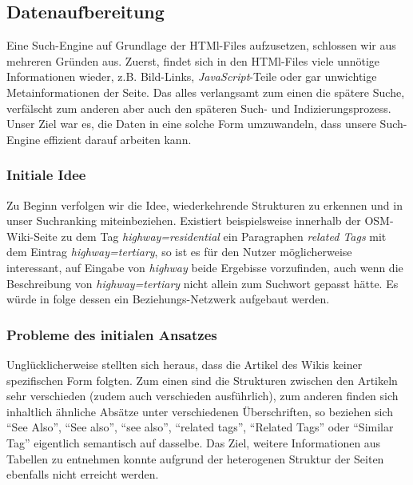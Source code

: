 \documentclass[12pt,pdftex,a4paper]{article}
\begin{document}
\subsection{Datenaufbereitung}
Eine Such-Engine auf Grundlage der HTMl-Files aufzusetzen, schlossen wir aus mehreren Gründen aus. Zuerst, findet sich in den HTMl-Files viele unnötige Informationen wieder, z.B. Bild-Links, \textit{JavaScript}-Teile oder gar unwichtige Metainformationen der Seite. Das alles verlangsamt zum einen die spätere Suche, verfälscht zum anderen aber auch den späteren Such- und Indizierungsprozess.\\
Unser Ziel war es, die Daten in eine solche Form umzuwandeln, dass unsere Such-Engine effizient darauf arbeiten kann.

\subsubsection{Initiale Idee}
Zu Beginn verfolgen wir die Idee, wiederkehrende Strukturen zu erkennen und in unser Suchranking miteinbeziehen. Existiert beispielsweise innerhalb der OSM-Wiki-Seite zu dem Tag \textit{highway=residential} ein Paragraphen \textit{related Tags} mit dem Eintrag \textit{highway=tertiary}, so ist es für den Nutzer möglicherweise interessant, auf Eingabe von \textit{highway} beide Ergebisse vorzufinden, auch wenn die Beschreibung von \textit{highway=tertiary} nicht allein zum Suchwort gepasst hätte. Es würde in folge dessen ein Beziehungs-Netzwerk aufgebaut werden.

\subsubsection{Probleme des initialen Ansatzes}
Unglücklicherweise stellten sich heraus, dass die Artikel des Wikis keiner spezifischen Form folgten. Zum einen sind die Strukturen zwischen den Artikeln sehr verschieden (zudem auch verschieden ausführlich), zum anderen finden sich inhaltlich ähnliche Absätze unter verschiedenen Überschriften, so beziehen sich ``See Also'', ``See also'', ``see also'', ``related tags'', ``Related Tags'' oder ``Similar Tag'' eigentlich semantisch auf dasselbe.
Das Ziel, weitere Informationen aus Tabellen zu entnehmen konnte aufgrund der heterogenen Struktur der Seiten ebenfalls nicht erreicht werden.
\end{document}
